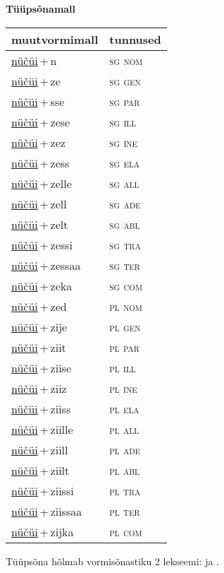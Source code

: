 
\vspace{1.8em}
\begin{minipage}{\textwidth}
\textbf{Tüüpsõnamall \,}\\

\begin{sideways}
\begin{tabular}{l l}
muutvormimall & tunnused \\
\hline
\underline{nüčüi}\,+\,n & \textsc{ sg nom } \\
\underline{nüčüi}\,+\,ze & \textsc{ sg gen } \\
\underline{nüčüi}\,+\,sse & \textsc{ sg par } \\
\underline{nüčüi}\,+\,zese & \textsc{ sg ill } \\
\underline{nüčüi}\,+\,zez & \textsc{ sg ine } \\
\underline{nüčüi}\,+\,zess & \textsc{ sg ela } \\
\underline{nüčüi}\,+\,zelle & \textsc{ sg all } \\
\underline{nüčüi}\,+\,zell & \textsc{ sg ade } \\
\underline{nüčüi}\,+\,zelt & \textsc{ sg abl } \\
\underline{nüčüi}\,+\,zessi & \textsc{ sg tra } \\
\underline{nüčüi}\,+\,zessaa & \textsc{ sg ter } \\
\underline{nüčüi}\,+\,zeka & \textsc{ sg com } \\
\underline{nüčüi}\,+\,zed & \textsc{ pl nom } \\
\underline{nüčüi}\,+\,zije & \textsc{ pl gen } \\
\underline{nüčüi}\,+\,ziit & \textsc{ pl par } \\
\underline{nüčüi}\,+\,ziise & \textsc{ pl ill } \\
\underline{nüčüi}\,+\,ziiz & \textsc{ pl ine } \\
\underline{nüčüi}\,+\,ziiss & \textsc{ pl ela } \\
\underline{nüčüi}\,+\,ziille & \textsc{ pl all } \\
\underline{nüčüi}\,+\,ziill & \textsc{ pl ade } \\
\underline{nüčüi}\,+\,ziilt & \textsc{ pl abl } \\
\underline{nüčüi}\,+\,ziissi & \textsc{ pl tra } \\
\underline{nüčüi}\,+\,ziissaa & \textsc{ pl ter } \\
\underline{nüčüi}\,+\,zijka & \textsc{ pl com } \\
\end{tabular}
\end{sideways}
\label{tab:tüüpsõnamall-nüčüin}

\end{minipage}

 
\vspace{1em}
\noindent Tüüpsõna hõlmab vormisõnastiku 2 lekseemi:  ja .
